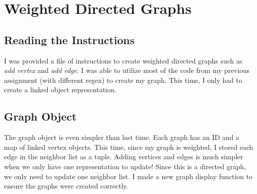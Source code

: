 \documentclass[letterpaper, 10pt]{article}
\begin{document}
\section{Weighted Directed Graphs}
\subsection{Reading the Instructions}
I was provided a file of instructions to create weighted directed graphs such as \textit{add vertex} and \textit{add edge}. I was able to utilize most of the code from my previous assignment (with different regex) to create my graph. This time, I only had to create a linked object representation.  


\subsection{Graph Object}
The graph object is even simpler than last time. Each graph has an ID and a map of linked vertex objects. This time, since my graph is weighted, I stored each edge in the neighbor list as a tuple. Adding vertices and edges is much simpler when we only have one representation to update! Since this is a directed graph, we only need to update one neighbor list. I made a new graph display function to ensure the graphs were created correctly.
 

\end{document}
